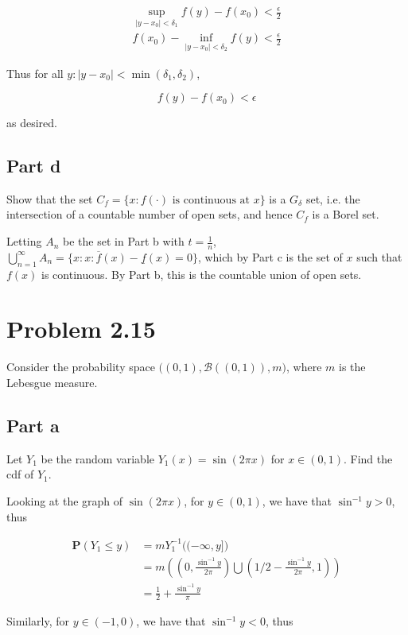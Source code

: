 \documentclass{article}
\newcommand{\B}{\mathcal{B}}
\newcommand{\prob}{\boldsymbol{P}}
\begin{document}
\begin{gather*}
\sup_{|y-x_0|<\delta_1} f(y) - f(x_0) < \frac{\epsilon}{2} \\
f(x_0) - \inf_{|y-x_0|<\delta_2} f(y) < \frac{\epsilon}{2}
\end{gather*}

Thus for all $y: |y-x_0| < \min(\delta_1, \delta_2)$,

\[
f(y) - f(x_0) < \epsilon
\]

as desired.

\subsection*{Part d}

Show that the set $C_f = \{x: f(\cdot)\text{ is continuous at } x\}$ is a $G_\delta$ set, i.e. the intersection of a countable number of open sets, and hence $C_f$ is a Borel set.

Letting $A_n$ be the set in Part b with $t = \frac{1}{n}$, $\bigcup_{n=1}^\infty A_n = \{x: x: \overline{f}(x) - \underline{f}(x) = 0 \}$, which by Part c is the set of $x$ such that $f(x)$ is continuous. By Part b, this is the countable union of open sets.

\section*{Problem 2.15}

Consider the probability space $\bigl((0, 1), \B((0, 1)), m \bigl)$, where $m$ is the Lebesgue measure.

\subsection*{Part a}

Let $Y_1$ be the random variable $Y_1(x) = \sin(2\pi x)$ for $x \in (0, 1)$. Find the cdf of $Y_1$.

Looking at the graph of $\sin(2\pi x)$, for $y \in (0, 1)$, we have that $\sin^{-1} y > 0$, thus

\begin{align*}
\prob(Y_1 \leq y) &= mY_1^{-1}\bigl( (-\infty, y] \bigr)\\
&= m\left( \left(0, \frac{\sin^{-1}y}{2\pi}\right) \bigcup \left(1/2 - \frac{\sin^{-1}y}{2\pi}, 1\right)  \right)\\
&= \frac{1}{2} + \frac{\sin^{-1}y}{\pi}
\end{align*}

Similarly, for $y \in (-1, 0)$, we have that $\sin^{-1} y < 0$, thus
\end{document}

